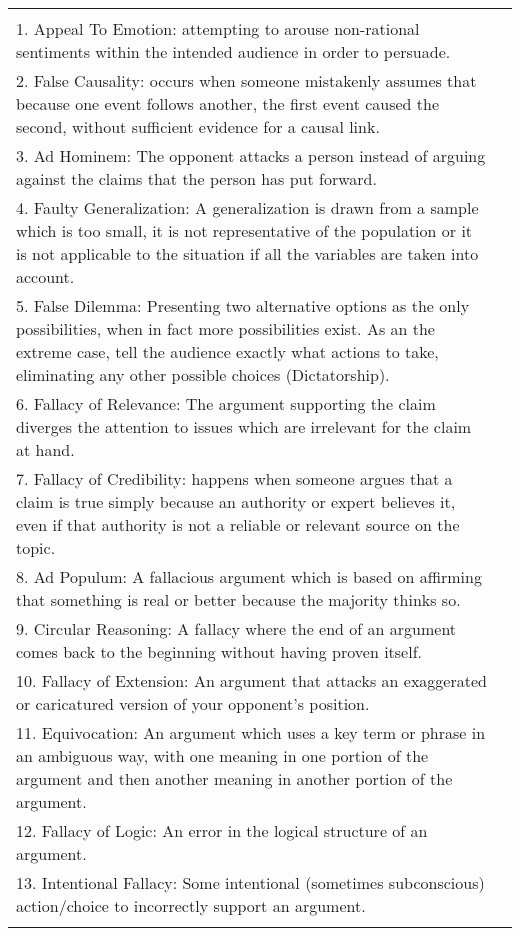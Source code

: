 \begin{table}[H]
\begin{tabular}{|m{}|m{}|}
{            Based on the following definitions of fallacies: \\
            1. Appeal To Emotion: attempting to arouse non-rational sentiments within the intended audience in order to persuade. \\
            2. False Causality: occurs when someone mistakenly assumes that because one event follows another, the first event caused the second, without sufficient evidence for a causal link. \\
            3. Ad Hominem: The opponent attacks a person instead of arguing against the claims that the person has put forward. \\
            4. Faulty Generalization: A generalization is drawn from a sample which is too small, it is not representative of the population or it is not applicable to the situation if all the variables are taken into account. \\
            5. False Dilemma: Presenting two alternative options as the only possibilities, when in fact more possibilities exist. As an the extreme case, tell the audience exactly what actions to take, eliminating any other possible choices (Dictatorship). \\
            6. Fallacy of Relevance: The argument supporting the claim diverges the attention to issues which are irrelevant for the claim at hand. \\
            7. Fallacy of Credibility: happens when someone argues that a claim is true simply because an authority or expert believes it, even if that authority is not a reliable or relevant source on the topic. \\
            8. Ad Populum: A fallacious argument which is based on affirming that something is real or better because the majority thinks so. \\
            9. Circular Reasoning: A fallacy where the end of an argument comes back to the beginning without having proven itself. \\
            10. Fallacy of Extension: An argument that attacks an exaggerated or caricatured version of your opponent’s position. \\
            11. Equivocation: An argument which uses a key term or phrase in an ambiguous way, with one meaning in one portion of the argument and then another meaning in another portion of the argument. \\
            12. Fallacy of Logic: An error in the logical structure of an argument. \\
            13. Intentional Fallacy: Some intentional (sometimes subconscious) action/choice to incorrectly support an argument. \\

}
\end{tabular}
\end{table}

